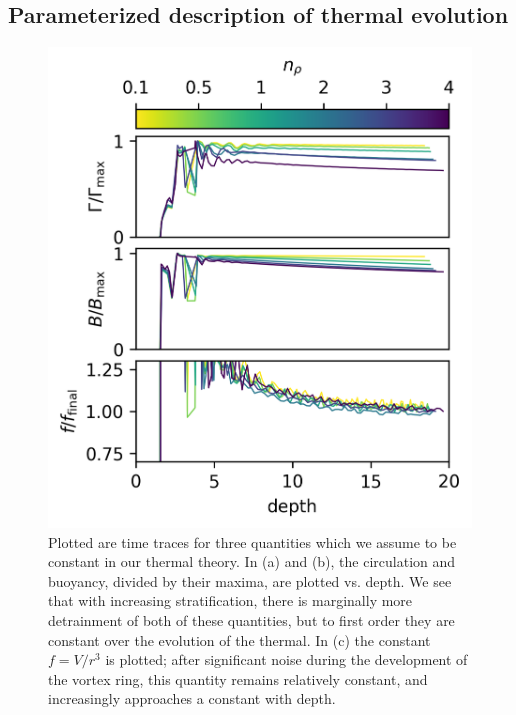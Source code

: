 \documentclass[twocolumn, amsmath, amsfonts, amssymb, trackchanges]{aastex62}
\begin{document}
\subsection{Parameterized description of thermal evolution}
\begin{figure}[t!]
    \includegraphics[width=\columnwidth]{constants.png}
    \caption{
	Plotted are time traces for three quantities which we assume to be constant in our thermal theory. 
	In (a) and (b), the circulation and buoyancy, divided by their maxima, are plotted vs. depth. 
	We see that with increasing stratification, there is marginally more detrainment of both of these quantities, but to first order they are constant over the	evolution of the thermal. 
	In (c) the constant $f = V/r^3$ is plotted; after significant noise during the development of the vortex ring, this quantity remains relatively constant, and increasingly approaches a constant with depth.
    \label{fig:constants} }
\end{figure}
\end{document}
